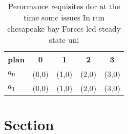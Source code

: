 \documentclass[a4paper]{article}
\begin{document}
\begin{table}
\begin{adjustbox}{width=0.5\columnwidth}
\begin{tabular}{|l|l|l|l|l|}
\hline
\textbf{plan} & \multicolumn{1}{c|}{\textbf{0}} & \multicolumn{1}{c|}{\textbf{1}} & \multicolumn{1}{c|}{\textbf{2}} & \multicolumn{1}{c|}{\textbf{3}} \\ \hline
\textbf{$a_0$}  & (0,0) & (1,0) & (2,0) & (3,0) \\ \hline
\textbf{$a_1$}  & (0,0) & (1,0) & (2,0) & (3,0) \\ \hline
\end{tabular}
\end{adjustbox}
\caption{Perormance requisites dor at the time some issues In run chesapeake bay Forces led steady state uni
}
\end{table}

\section{Section}
\end{document}
